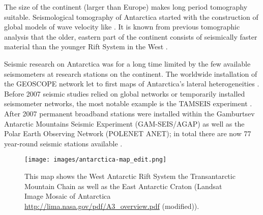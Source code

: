 The size of the continent (larger than Europe) makes long period tomography suitable.  
Seismological tomography of Antarctica started with the construction of global models of wave velocity like \citealp{Woodhouse1984}.
It is known from previous tomographic analysis that the older, eastern part of the continent consists of seismically faster material than 
the younger Rift System in the West \citep{Morelli2004}.

Seismic research on Antarctica was for a long time limited by the few available seismometers at research stations on the continent. 
The worldwide installation of the GEOSCOPE network let to first maps of Antarctica's lateral heterogeneities \citep{Roult1994}.
Before 2007 seismic studies relied on global networks or temporarily installed seismometer networks, the most notable
example is the TAMSEIS experiment \citep{Lawrence2006}. 
After 2007 permanent broadband stations were installed within the Gamburtsev Antarctic Mountains Seismic Experiment (GAM-SEIS/AGAP)
as well as the Polar Earth Observing Network (POLENET ANET); 
in total there are now 77 year-round seismic stations available \citep{Anthony2014}.  




 


\begin{figure}[h]
\begin{center}
\texttt{[image: images/antarctica-map\_edit.png]}
\caption[Map of Antarctica \url{http://lima.nasa.gov/pdf/A3_overview.pdf}.]
{This map shows the West Antarctic Rift System the Transantarctic Mountain Chain as well as the East Antarctic Craton 
(Landsat Image Mosaic of Antarctica \url{http://lima.nasa.gov/pdf/A3_overview.pdf} (modified)).}
\label{ant-map}
\end{center}
\end{figure}




